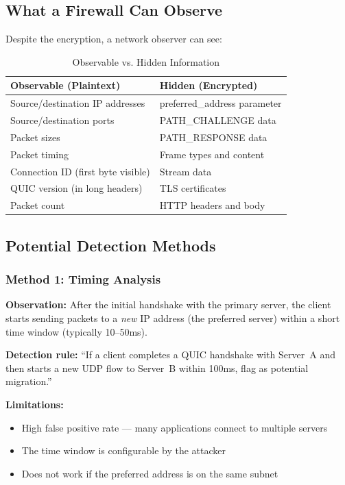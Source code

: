 \documentclass[11pt,a4paper]{article}
\begin{document}
\subsection{What a Firewall Can Observe}

Despite the encryption, a network observer can see:

\begin{table}[h]
\centering
\caption{Observable vs. Hidden Information}
\begin{tabular}{ll}
\toprule
\textbf{Observable (Plaintext)} & \textbf{Hidden (Encrypted)} \\
\midrule
Source/destination IP addresses & preferred\_address parameter \\
Source/destination ports & PATH\_CHALLENGE data \\
Packet sizes & PATH\_RESPONSE data \\
Packet timing & Frame types and content \\
Connection ID (first byte visible) & Stream data \\
QUIC version (in long headers) & TLS certificates \\
Packet count & HTTP headers and body \\
\bottomrule
\end{tabular}
\end{table}

\subsection{Potential Detection Methods}

\subsubsection{Method 1: Timing Analysis}

\textbf{Observation:} After the initial handshake with the primary server, the client starts sending packets to a \textit{new} IP address (the preferred server) within a short time window (typically 10--50ms).

\textbf{Detection rule:} ``If a client completes a QUIC handshake with Server~A and then starts a new UDP flow to Server~B within 100ms, flag as potential migration.''

\textbf{Limitations:}
\begin{itemize}
    \item High false positive rate --- many applications connect to multiple servers
    \item The time window is configurable by the attacker
    \item Does not work if the preferred address is on the same subnet
\end{itemize}
\end{document}
